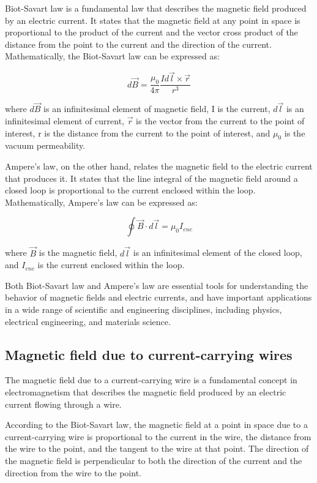 \documentclass{article}
\begin{document}
Biot-Savart law is a fundamental law that describes the magnetic field produced
by an electric current. It states that the magnetic field at any point in space
is proportional to the product of the current and the vector cross product of
the distance from the point to the current and the direction of the current.
Mathematically, the Biot-Savart law can be expressed as:

\[d\vec{B} = \frac{\mu_0}{4\pi} \frac{Id\vec{l} \times \vec{r}}{r^3}\]

where $d\vec{B}$ is an infinitesimal element of magnetic field, I is the current,
$d\vec{l}$ is an infinitesimal element of current, $\vec{r}$ is the vector from the
current to the point of interest, r is the distance from the current to the
point of interest, and $μ_0$ is the vacuum permeability.

Ampere's law, on the other hand, relates the magnetic field to the electric
current that produces it. It states that the line integral of the magnetic
field around a closed loop is proportional to the current enclosed within the
loop. Mathematically, Ampere's law can be expressed as:

\[\oint \vec{B} \cdot d\vec{l} = \mu_0 I_{enc}\]

where $\vec{B}$ is the magnetic field, $d\vec{l}$ is an infinitesimal element of
the closed loop, and $I_{enc}$ is the current enclosed within the loop.

Both Biot-Savart law and Ampere's law are essential tools for understanding the
behavior of magnetic fields and electric currents, and have important
applications in a wide range of scientific and engineering disciplines,
including physics, electrical engineering, and materials science.
\subsection{Magnetic field due to current-carrying wires} %
\label{ssub:Magnetic field due to current-carrying wires}
The magnetic field due to a current-carrying wire is a fundamental concept in
electromagnetism that describes the magnetic field produced by an electric
current flowing through a wire.

According to the Biot-Savart law, the magnetic field at a point in space due to
a current-carrying wire is proportional to the current in the wire, the
distance from the wire to the point, and the tangent to the wire at that point.
The direction of the magnetic field is perpendicular to both the direction of
the current and the direction from the wire to the point.
\end{document}
